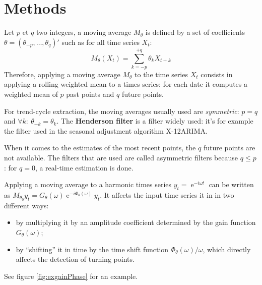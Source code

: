 \documentclass[
  12pt,
  ,
  a4paper]{article}
\DeclareMathOperator{\e}{e}
\begin{document}
\hypertarget{methods}{%
\section{Methods}\label{methods}}

Let \(p\) et \(q\) two integers, a moving average \(M_\theta\) is defined by a set of coefficients \(\theta=(\theta_{-p},\dots,\theta_{q})'\) such as for all time series \(X_t\):
\[
M_\theta(X_t)=\sum_{k=-p}^{+q}\theta_kX_{t+k}
\]
Therefore, applying a moving average \(M_\theta\) to the time series \(X_t\) consists in applying a rolling weighted mean to a times series: for each date it computes a weighted mean of \(p\) past points and \(q\) future points.

For trend-cycle extraction, the moving averages usually used are \emph{symmetric}: \(p=q\) and \(\forall k:\:\theta_{-k} = \theta_k\).
The \textbf{Henderson filter} is a filter widely used: it's for example the filter used in the seasonal adjustment algorithm X-12ARIMA.

When it comes to the estimates of the most recent points, the \(q\) future points are not available.
The filters that are used are called asymmetric filters because \(q\leq p\): for \(q=0\), a real-time estimation is done.

Applying a moving average to a harmonic times series \(y_t=\e^{-i\omega t}\) can be written as \(M_{\theta_0}y_t=G_\theta(\omega)\e^{-i\Phi_\theta(\omega)}y_t\). It affects the input time series it in in two different ways:

\begin{itemize}
\item
  by multiplying it by an amplitude coefficient determined by the gain function \(G_{\theta}\left(\omega\right)\);
\item
  by ``shifting'' it in time by the time shift function \(\Phi_\theta(\omega)/\omega\), which directly affects the detection of turning points.
\end{itemize}

See figure \ref{fig:exgainPhase} for an example.
\end{document}
